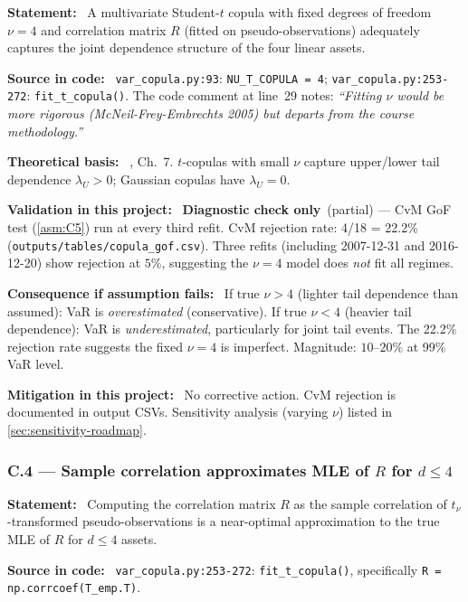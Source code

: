 \documentclass[11pt,a4paper]{article}
\newcommand{\asmfield}[1]{\medskip\noindent\textbf{#1:}\ }
\newcommand{\code}[1]{\texttt{#1}}
\newcommand{\diagnostic}{\textbf{Diagnostic check only}}
\begin{document}
\asmfield{Statement}
A multivariate Student-$t$ copula with fixed degrees of freedom $\nu = 4$
and correlation matrix $R$ (fitted on pseudo-observations) adequately
captures the joint dependence structure of the four linear assets.

\asmfield{Source in code}
\code{var\_copula.py:93}: \lstinline|NU_T_COPULA = 4|;
\code{var\_copula.py:253-272}: \code{fit\_t\_copula()}.
The code comment at line~29 notes: \emph{``Fitting $\nu$ would be more
rigorous (McNeil-Frey-Embrechts 2005) but departs from the course
methodology.''}

\asmfield{Theoretical basis}
\cite{McNeilFreyEmbrechts2005}, Ch.~7. $t$-copulas with small $\nu$ capture
upper/lower tail dependence $\lambda_U > 0$; Gaussian copulas have
$\lambda_U = 0$.

\asmfield{Validation in this project}
\diagnostic\ (partial) --- CvM GoF test (\cref{asm:C5}) run at every third
refit. CvM rejection rate: 4/18 = 22.2\% (\code{outputs/tables/copula\_gof.csv}).
Three refits (including 2007-12-31 and 2016-12-20) show rejection at $5\%$,
suggesting the $\nu = 4$ model does \emph{not} fit all regimes.

\asmfield{Consequence if assumption fails}
If true $\nu > 4$ (lighter tail dependence than assumed): VaR is
\emph{overestimated} (conservative). If true $\nu < 4$ (heavier tail
dependence): VaR is \emph{underestimated}, particularly for joint tail
events. The 22.2\% rejection rate suggests the fixed $\nu = 4$ is
imperfect. Magnitude: $10$--$20\%$ at 99\% VaR level.

\asmfield{Mitigation in this project}
No corrective action. CvM rejection is documented in output CSVs. Sensitivity
analysis (varying $\nu$) listed in \cref{sec:sensitivity-roadmap}.

\subsubsection{C.4 --- Sample correlation approximates MLE of $R$ for $d \le 4$}\label{asm:C4}

\asmfield{Statement}
Computing the correlation matrix $R$ as the sample correlation of
$t_\nu$-transformed pseudo-observations is a near-optimal approximation
to the true MLE of $R$ for $d \le 4$ assets.

\asmfield{Source in code}
\code{var\_copula.py:253-272}: \code{fit\_t\_copula()}, specifically
\lstinline|R = np.corrcoef(T_emp.T)|.
\end{document}

